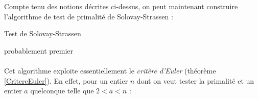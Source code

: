 		Compte tenu des notions décrites ci-dessus, on peut maintenant construire l'algorithme de test de primalité de Solovay-Strassen :\\
		
		\begin{algorithm}[H]
			\caption{Test de Solovay-Strassen}\label{TSS}
		\Retour probablement premier\;
		\end{algorithm}
		
		\paragraph{} Cet algorithme exploite essentiellement le \textit{critère d'Euler} (théorème \ref{CritereEuler}). En effet, pour un entier $n$ dont on veut tester la primalité et un entier $a$ quelconque telle que $2 < a < n$ :
